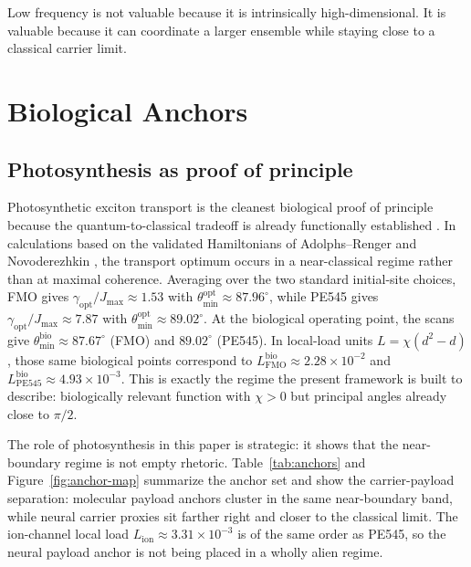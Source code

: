 \documentclass[11pt,a4paper]{article}
\theoremstyle{definition}
\theoremstyle{remark}
\begin{document}
Low frequency is not valuable because it is intrinsically high-dimensional. It is valuable because it can coordinate a larger ensemble while staying close to a classical carrier limit.

\section{Biological Anchors}
\label{sec:anchors}

\subsection{Photosynthesis as proof of principle}

Photosynthetic exciton transport is the cleanest biological proof of principle because the quantum-to-classical tradeoff is already functionally established \cite{engel2007evidence,mohseni2008environment,plenio2008dephasing,rebentrost2009environment,cao2020quantum}. In calculations based on the validated Hamiltonians of Adolphs--Renger and Novoderezhkin \cite{adolphs2006proteins,novoderezhkin2010excitation}, the transport optimum occurs in a near-classical regime rather than at maximal coherence. Averaging over the two standard initial-site choices, FMO gives $\gamma_{\mathrm{opt}}/J_{\max}\approx 1.53$ with $\theta_{\min}^{\mathrm{opt}}\approx 87.96^\circ$, while PE545 gives $\gamma_{\mathrm{opt}}/J_{\max}\approx 7.87$ with $\theta_{\min}^{\mathrm{opt}}\approx 89.02^\circ$. At the biological operating point, the scans give $\theta_{\min}^{\mathrm{bio}}\approx 87.67^\circ$ (FMO) and $89.02^\circ$ (PE545). In local-load units $L=\chi(d^2-d)$, those same biological points correspond to $L_{\mathrm{FMO}}^{\mathrm{bio}}\approx 2.28\times10^{-2}$ and $L_{\mathrm{PE545}}^{\mathrm{bio}}\approx 4.93\times10^{-3}$. This is exactly the regime the present framework is built to describe: biologically relevant function with $\chi>0$ but principal angles already close to $\pi/2$.

The role of photosynthesis in this paper is strategic: it shows that the near-boundary regime is not empty rhetoric. Table~\ref{tab:anchors} and Figure~\ref{fig:anchor-map} summarize the anchor set and show the carrier-payload separation: molecular payload anchors cluster in the same near-boundary band, while neural carrier proxies sit farther right and closer to the classical limit. The ion-channel local load $L_{\mathrm{ion}}\approx 3.31\times10^{-3}$ is of the same order as PE545, so the neural payload anchor is not being placed in a wholly alien regime.
\end{document}
